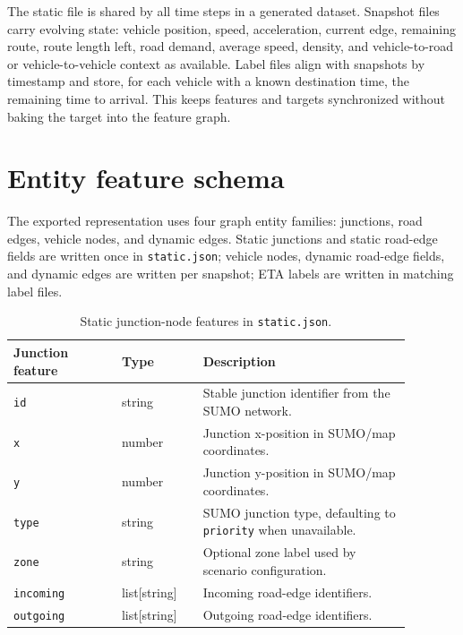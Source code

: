 The static file is shared by all time steps in a generated dataset. Snapshot files carry evolving state: vehicle position, speed, acceleration, current edge, remaining route, route length left, road demand, average speed, density, and vehicle-to-road or vehicle-to-vehicle context as available. Label files align with snapshots by timestamp and store, for each vehicle with a known destination time, the remaining time to arrival. This keeps features and targets synchronized without baking the target into the feature graph.

\section{Entity feature schema}
The exported representation uses four graph entity families: junctions, road edges, vehicle nodes, and dynamic edges. Static junctions and static road-edge fields are written once in \texttt{static.json}; vehicle nodes, dynamic road-edge fields, and dynamic edges are written per snapshot; ETA labels are written in matching label files.

\begin{table}[!htbp]
\centering
\scriptsize
\begin{tabular}{p{0.24\linewidth}p{0.18\linewidth}p{0.46\linewidth}}
\toprule
\textbf{Junction feature} & \textbf{Type} & \textbf{Description} \\
\midrule
\texttt{id} & string & Stable junction identifier from the SUMO network. \\
\texttt{x} & number & Junction x-position in SUMO/map coordinates. \\
\texttt{y} & number & Junction y-position in SUMO/map coordinates. \\
\texttt{type} & string & SUMO junction type, defaulting to \texttt{priority} when unavailable. \\
\texttt{zone} & string & Optional zone label used by scenario configuration. \\
\texttt{incoming} & list[string] & Incoming road-edge identifiers. \\
\texttt{outgoing} & list[string] & Outgoing road-edge identifiers. \\
\bottomrule
\end{tabular}
\caption{Static junction-node features in \texttt{static.json}.}
\label{tab:junction_features}
\end{table}


